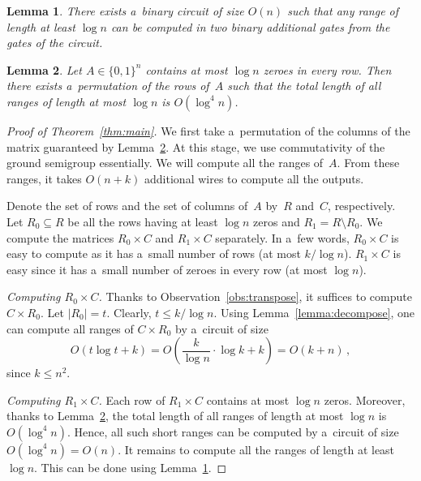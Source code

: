 \documentclass[11pt,letterpaper]{article}
\newtheorem{lemma}{Lemma}
\begin{document}
\begin{lemma}\label{lemma:blocks}
There exists a~binary circuit of size $O(n)$ such that any range 
of length at least $\log n$ can be computed in two binary 
additional gates from the gates of the circuit.
\end{lemma}

\begin{lemma}\label{lemma:permute}
Let $A \in \{0,1\}^n$ contains at most $\log n$ zeroes in 
every row. Then there exists a~permutation of the rows of~$A$
such that the total length of all ranges of length 
at most $\log n$ is $O(\log^4 n)$.
\end{lemma}



\begin{proof}[Proof of Theorem~\ref{thm:main}]
We first take a~permutation of the columns of the matrix 
guaranteed by Lemma~\ref{lemma:permute}. At this stage, 
we use commutativity of the ground semigroup essentially.
We will compute all the ranges of~$A$. From these ranges, 
it takes $O(n+k)$ additional wires to compute all the outputs.

Denote the set of rows and the set of columns of~$A$ by~$R$
and~$C$, respectively. Let $R_0 \subseteq R$ be all the rows
having at least $\log n$ zeros and $R_1=R \setminus R_0$. We 
compute the matrices $R_0 \times C$ and $R_1 \times C$ 
separately. In a~few words, $R_0 \times C$ is easy to compute 
as it has a~small number of rows (at most $k/\log n$). $R_1 \times C$ is easy since it has a~small number of zeroes in 
every row (at most $\log n$).

\emph{Computing $R_0 \times C$.} Thanks to 
Observation~\ref{obs:transpose}, it suffices 
to compute $C \times R_0$. 
Let $|R_0|=t$. Clearly, $t \le k/\log n$. 
Using Lemma~\ref{lemma:decompose}, one can compute all
ranges of $C \times R_0$ by a~circuit of size
\[O(t\log t+k)=O\left(\frac{k}{\log n} \cdot \log k+k\right)=O(k+n)\, ,\]
since $k \le n^2$.

\emph{Computing $R_1 \times C$.} Each row of 
$R_1 \times C$ contains at most $\log n$ zeros. Moreover,
thanks to Lemma~\ref{lemma:permute}, the total length of all 
ranges of length at most $\log n$ is $O(\log^4n)$. Hence, all 
such short ranges can be computed by a~circuit of size~
$O(\log^4n)=O(n)$. It remains to compute all the ranges of 
length at least~$\log n$. This can be done using Lemma~\ref{lemma:blocks}.
\end{proof}
\end{document}

